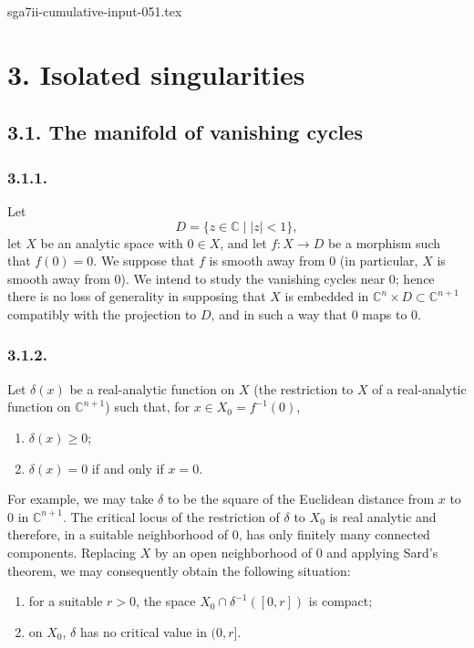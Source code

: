 \begin{filecontents*}{sga7ii-cumulative-input-051.tex}
\section*{3. Isolated singularities}

\subsection*{3.1. The manifold of vanishing cycles}

\subsubsection*{3.1.1.}
Let
\[
D=\{z\in\mathbb C\mid |z|<1\},
\]
let $X$ be an analytic space with $0\in X$, and let
$f:X\to D$ be a morphism such that $f(0)=0$.  We suppose that $f$ is
smooth away from $0$ (in particular, $X$ is smooth away from $0$).
We intend to study the vanishing cycles near $0$; hence there is no
loss of generality in supposing that $X$ is embedded in
$\mathbb C^n\times D\subset\mathbb C^{n+1}$ compatibly with the
projection to $D$, and in such a way that $0$ maps to $0$.

\subsubsection*{3.1.2.}
Let $\delta(x)$ be a real-analytic function on $X$ (the restriction to
$X$ of a real-analytic function on $\mathbb C^{n+1}$) such that, for
$x\in X_0=f^{-1}(0)$,

\begin{enumerate}[label=(\alph*)]
\item $\delta(x)\geq 0$;
\item $\delta(x)=0$ if and only if $x=0$.
\end{enumerate}

For example, we may take $\delta$ to be the square of the Euclidean
distance from $x$ to $0$ in $\mathbb C^{n+1}$.  The critical locus of
the restriction of $\delta$ to $X_0$ is real analytic and therefore,
in a suitable neighborhood of $0$, has only finitely many connected
components.  Replacing $X$ by an open neighborhood of $0$ and applying
Sard's theorem, we may consequently obtain the following situation:

\begin{enumerate}[label=(\alph*),start=3]
\item for a suitable $r>0$, the space
  $X_0\cap\delta^{-1}([0,r])$ is compact;
\item on $X_0$, $\delta$ has no critical value in $(0,r]$.
\end{enumerate}


\end{filecontents*}
